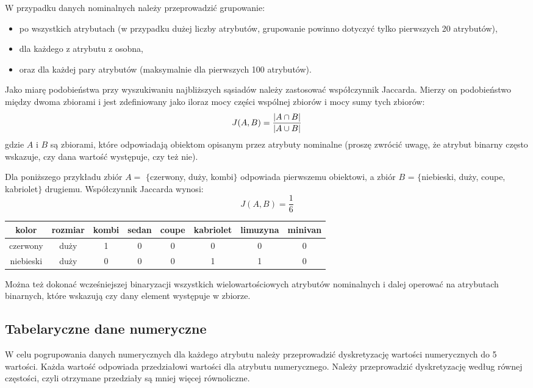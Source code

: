 \documentclass[a4paper,11pt]{article}
\begin{document}
W przypadku danych nominalnych należy przeprowadzić grupowanie:
\begin{itemize}
\item po wszystkich atrybutach (w przypadku dużej liczby atrybutów, grupowanie powinno dotyczyć tylko pierwszych 20 atrybutów),
\item dla każdego z atrybutu z osobna,
\item oraz dla każdej pary atrybutów (maksymalnie dla pierwszych 100 atrybutów).
\end{itemize}  

Jako miarę podobieństwa przy wyszukiwaniu najbliższych sąsiadów należy zastosować współczynnik Jaccarda. Mierzy on podobieństwo między dwoma zbiorami i jest zdefiniowany jako iloraz mocy części wspólnej zbiorów i mocy sumy tych zbiorów:
$$
    J (A,B) = {{|A \cap B|}\over{|A \cup B|}} 
$$
gdzie $A$ i $B$ są zbiorami, które odpowiadają obiektom opisanym przez atrybuty nominalne (proszę zwrócić uwagę, że atrybut binarny często wskazuje, czy dana wartość występuje, czy też nie).

Dla poniższego przykładu zbiór $A =$ $\{$czerwony, duży, kombi$\}$ odpowiada pierwszemu obiektowi, a zbiór $B$ = $\{$niebieski, duży, coupe, kabriolet$\}$ drugiemu. Współczynnik Jaccarda wynosi:
$$
J (A,B) = \frac{1}{6}
$$


\begin{center}
\begin{tabular}{cccccccc}
kolor & rozmiar & kombi & sedan & coupe & kabriolet & limuzyna & minivan \\
\hline
czerwony & duży & 1 & 0 & 0 & 0 & 0 & 0 \\
niebieski & duży & 0 & 0 & 0 & 1 & 1 &  0 \\
\hline
\end{tabular}
\end{center}

Można też dokonać wcześniejszej binaryzacji wszystkich wielowartościowych atrybutów nominalnych i dalej operować na atrybutach binarnych, które wskazują czy dany element występuje w zbiorze.


\subsection{Tabelaryczne dane numeryczne}

W celu pogrupowania danych numerycznych dla każdego atrybutu należy przeprowadzić dyskretyzację wartości numerycznych do 5 wartości. Każda wartość odpowiada przedziałowi wartości dla atrybutu numerycznego. Należy przeprowadzić dyskretyzację według równej częstości, czyli otrzymane przedziały są mniej więcej równoliczne.
\end{document}
